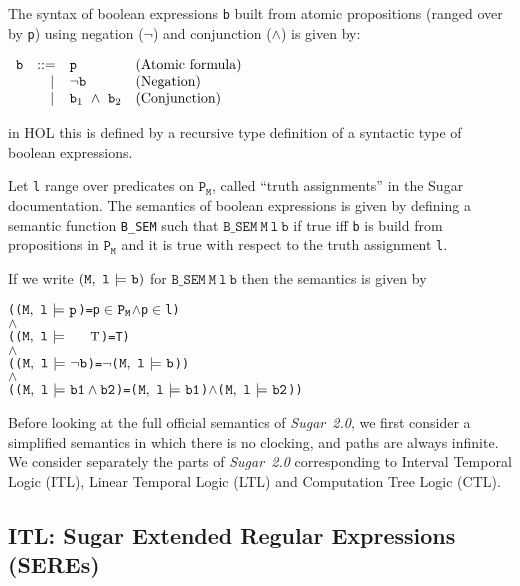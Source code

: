 \documentclass{llncs}
\newcommand{\And}{\(\wedge\)}
\newcommand{\Not}{\(\neg\)}
\newcommand{\In}{\(\in\)}
\newcommand{\T}{\texttt{\small\rm{T}}}
\newcommand{\bTrue}{\T}
\newcommand{\BSem}[3]{(\(\tt#1,~#2~{\models}~#3\))}
\newcommand{\Bsem}{\texttt{B\_SEM}\xspace}
\newcommand{\bSem}[3]{(\tt#1,~#2~{\models}~#3)}
\newcommand{\bProp}[1]{#1}
\newcommand{\bNot}[1]{\neg#1}
\newcommand{\bAnd}[2]{#1\wedge#2}
\newcommand\Sugar{{\it{Sugar~2.0}}\xspace}
\newcommand\Hol{HOL\xspace}
\renewcommand{\t}[1]{\texttt{#1}}
\begin{document}
The syntax of boolean expressions \t{b}
built from atomic propositions
(ranged over by \t{p}) using negation ($\neg$) and conjunction ($\wedge$)
is given by:


\medskip

$\begin{array}{ccll}
{\t{b}} & {\rm ::=} & \t{p}
  & \mbox{\rm(Atomic formula)}\\
 & \phantom{\rm ::}\mid & \neg{\t{b}}
  & \mbox{\rm(Negation)}\\
 & \phantom{\rm ::}\mid & {\t{b}}_1~\wedge~{\t{b}}_2
  & \mbox{\rm(Conjunction)}\\
\end{array}$

\medskip

\noindent in \Hol this is defined by a recursive type definition of
a syntactic type of boolean expressions.

Let \t{l} range over predicates on $\t{P}_{\t{M}}$, called ``truth assignments'' in the Sugar
documentation.
The semantics of boolean expressions
is given by defining a semantic function \Bsem such that
$\Bsem~\t{M}~\t{l}~\t{b}$ if true iff \t{b} is build from propositions in $\t{P}_{\t{M}}$ and
it is true with respect to the truth assignment \t{l}.

If we write $\bSem{M}{l}{b}$ for $\Bsem~\t{M}~\t{l}~\t{b}$
then the semantics is given by


{\begin{alltt}
   ({\BSem{M}{l}{\bProp{p}}}     = p {\In} \(\t{P}\sb{\t{M}}\) {\And} p {\In} l)
   {\And}
   ({\BSem{M}{l}{\bTrue}}     = T)
   {\And}
   ({\BSem{M}{l}{{\bNot{b}}}}    = {\Not}{\BSem{M}{l}{b}})
   {\And}
   ({\BSem{M}{l}{\bAnd{b1}{b2}}} = {\BSem{M}{l}{b1}} {\And} {\BSem{M}{l}{b2}})
\end{alltt}}

\medskip



Before looking at the full official semantics of \Sugar, we first
consider a simplified semantics in which there is no clocking, and paths
are always infinite. We consider separately the parts of \Sugar corresponding
to Interval Temporal Logic (ITL), Linear Temporal Logic (LTL) and
Computation Tree Logic (CTL).


\subsection{ITL: Sugar Extended Regular Expressions (SEREs)}\label{SimpleSERE}
\end{document}

